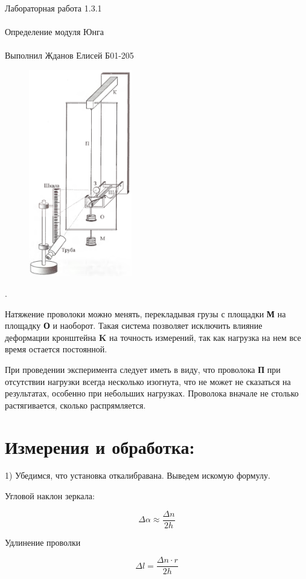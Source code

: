 \documentclass{astroedu-lab}
\begin{document}
\begin{problem}{\huge Лабораторная работа 1.3.1\\\\Определение модуля Юнга\\\\Выполнил Жданов Елисей Б01-205}
\begin{figure}
\includegraphics[width=0.4\textwidth]{pribor.png}
\caption{}
\label{ris:image}
\end{figure}.

Натяжение проволоки можно менять, перекладывая грузы с площадки \textbf{М} на площадку \textbf{О} и наоборот. Такая система позволяет исключить влияние деформации кронштейна \textbf{K} на точность измерений, так как нагрузка на нем все время остается постоянной.

При проведении эксперимента следует иметь в виду, что проволока \textbf{П} при отсутствии нагрузки всегда несколько изогнута, что не может не сказаться на результатах, особенно при небольших нагрузках. Проволока вначале не столько растягивается, сколько распрямляется.

\section{Измерения и обработка:}

1) Убедимся, что установка откалибравана. Выведем искомую формулу.

Угловой наклон зеркала:

\begin{equation}
	\Delta \alpha \approx \frac{\Delta n}{2 h}
\end{equation}

Удлинение проволки


\begin{equation}
	\boxed{\Delta l = \frac{\Delta n \cdot r}{2 h}}
\end{equation}


\end{problem}
\end{document}
